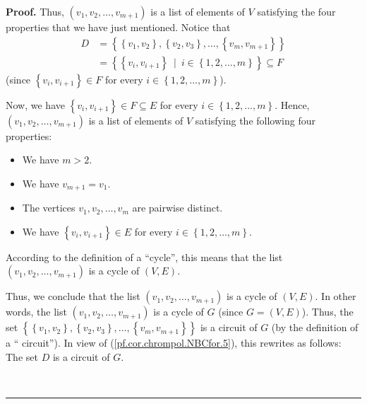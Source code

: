 \documentclass[numbers=enddot,12pt,final,onecolumn,notitlepage]{scrartcl}%
\theoremstyle{definition}
\newenvironment{proof}[1][Proof]{\noindent\textbf{#1.} }{\ \rule{0.5em}{0.5em}}
\newenvironment{verlong}{}{}
\begin{document}
\begin{verlong}
\begin{proof}
Thus, $\left(  v_{1},v_{2},\ldots,v_{m+1}\right)  $ is a list of elements of
$V$ satisfying the four properties that we have just mentioned. Notice that%
\begin{align*}
D  &  =\left\{  \left\{  v_{1},v_{2}\right\}  ,\left\{  v_{2},v_{3}\right\}
,\ldots,\left\{  v_{m},v_{m+1}\right\}  \right\} \\
&  =\left\{  \left\{  v_{i},v_{i+1}\right\}  \ \mid\ i\in\left\{
1,2,\ldots,m\right\}  \right\}  \subseteq F
\end{align*}
(since $\left\{  v_{i},v_{i+1}\right\}  \in F$ for every $i\in\left\{
1,2,\ldots,m\right\}  $).

Now, we have $\left\{  v_{i},v_{i+1}\right\}  \in F\subseteq E$ for every
$i\in\left\{  1,2,\ldots,m\right\}  $. Hence, $\left(  v_{1},v_{2}%
,\ldots,v_{m+1}\right)  $ is a list of elements of $V$ satisfying the
following four properties:

\begin{itemize}
\item We have $m>2$.

\item We have $v_{m+1}=v_{1}$.

\item The vertices $v_{1},v_{2},\ldots,v_{m}$ are pairwise distinct.

\item We have $\left\{  v_{i},v_{i+1}\right\}  \in E$ for every $i\in\left\{
1,2,\ldots,m\right\}  $.
\end{itemize}

According to the definition of a \textquotedblleft cycle\textquotedblright,
this means that the list $\left(  v_{1},v_{2},\ldots,v_{m+1}\right)  $ is a
cycle of $\left(  V,E\right)  $.

Thus, we conclude that the list $\left(  v_{1},v_{2},\ldots,v_{m+1}\right)  $
is a cycle of $\left(  V,E\right)  $. In other words, the list $\left(
v_{1},v_{2},\ldots,v_{m+1}\right)  $ is a cycle of $G$ (since $G=\left(
V,E\right)  $). Thus, the set $\left\{  \left\{  v_{1},v_{2}\right\}
,\left\{  v_{2},v_{3}\right\}  ,\ldots,\left\{  v_{m},v_{m+1}\right\}
\right\}  $ is a circuit of $G$ (by the definition of a \textquotedblleft
circuit\textquotedblright). In view of (\ref{pf.cor.chrompol.NBCfor.5}), this
rewrites as follows: The set $D$ is a circuit of $G$.


\end{proof}
\end{verlong}
\end{document}
